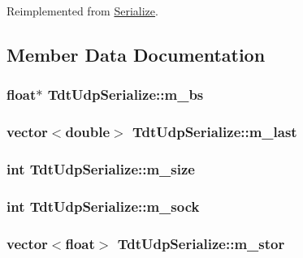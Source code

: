 Reimplemented from \hyperlink{classSerialize_ac94a76de6c9376e33b4c195d50ff0568}{Serialize}.



\subsection{Member Data Documentation}
\hypertarget{classTdtUdpSerialize_a4eb083f9bac5c666d5221113723e7674}{
\subsubsection[{m\-\_\-bs}]{\setlength{\rightskip}{0pt plus 5cm}float$\ast$ Tdt\-Udp\-Serialize\-::m\-\_\-bs}}\label{classTdtUdpSerialize_a4eb083f9bac5c666d5221113723e7674}
\hypertarget{classTdtUdpSerialize_a434574fb0198a3264abfdbdb28988848}{
\subsubsection[{m\-\_\-last}]{\setlength{\rightskip}{0pt plus 5cm}vector$<$double$>$ Tdt\-Udp\-Serialize\-::m\-\_\-last}}\label{classTdtUdpSerialize_a434574fb0198a3264abfdbdb28988848}
\hypertarget{classTdtUdpSerialize_a80d8a9074ab3285377fd5e760713c5eb}{
\subsubsection[{m\-\_\-size}]{\setlength{\rightskip}{0pt plus 5cm}int Tdt\-Udp\-Serialize\-::m\-\_\-size}}\label{classTdtUdpSerialize_a80d8a9074ab3285377fd5e760713c5eb}
\hypertarget{classTdtUdpSerialize_aa3fe3872eb26f196f0c01b077326a2b1}{
\subsubsection[{m\-\_\-sock}]{\setlength{\rightskip}{0pt plus 5cm}int Tdt\-Udp\-Serialize\-::m\-\_\-sock}}\label{classTdtUdpSerialize_aa3fe3872eb26f196f0c01b077326a2b1}
\hypertarget{classTdtUdpSerialize_a4e644b3558110f98227c8888c5cd2ba1}{
\subsubsection[{m\-\_\-stor}]{\setlength{\rightskip}{0pt plus 5cm}vector$<$float$>$ Tdt\-Udp\-Serialize\-::m\-\_\-stor}}\label{classTdtUdpSerialize_a4e644b3558110f98227c8888c5cd2ba1}
